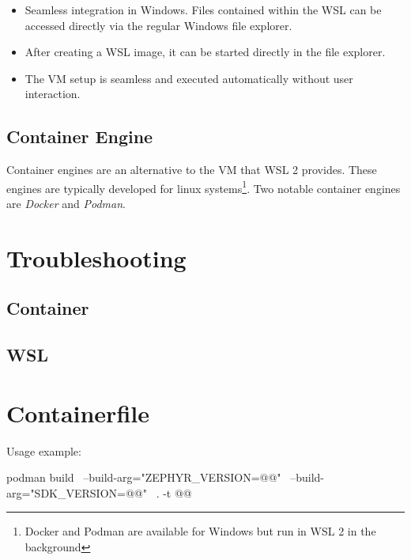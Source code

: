 \begin{itemize}
  \item Seamless integration in Windows.
    Files contained within the WSL can be accessed directly via the regular Windows file explorer.
  \item After creating a WSL image, it can be started directly in the file explorer.
  \item The VM setup is seamless and executed automatically without user
    interaction.
\end{itemize}

\subsection{Container Engine}
Container engines are an alternative to the VM that WSL 2 provides.
These engines are typically developed for linux systems\footnote{Docker and Podman are available for Windows but run in WSL 2 in the background}.
Two notable container engines are \emph{Docker} and \emph{Podman}.

\newpage



\newpage



\newpage


\newpage


\newpage

\appendix



\section{Troubleshooting}



\subsection{Container}



\subsection{WSL}



\newpage
\fancyfoot{}

\section{Containerfile}\label{containerfile}



Usage example:

\begin{monobox}
podman build \
  --build-arg="ZEPHYR_VERSION=@\zephyrversion{}@" \
  --build-arg="SDK_VERSION=@\sdkversion{}@" \
  . -t @\imagename{}@
\end{monobox}


